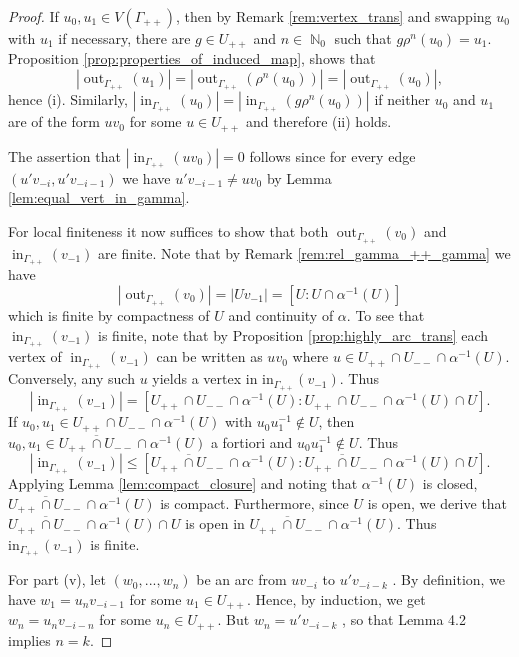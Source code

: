 \documentclass{article}
\DeclareMathOperator\out{out}
\DeclareMathOperator\bbN{\mathbb{N}}
\theoremstyle{definition}
\begin{document}
\begin{proof}
If $u_0,u_1\in V(\Gamma_{++})$, then by Remark \ref{rem:vertex_trans} and swapping $u_0$ with $u_1$ if necessary, there are $g\in U_{++}$ and $n\in\bbN_{0}$ such that $g\rho^{n}(u_0) = u_1$. Proposition \ref{prop:properties_of_induced_map}, shows that \[|\out_{\Gamma_{++}}(u_1)|=|\out_{\Gamma_{++}}(\rho^{n}(u_0))| = |\out_{\Gamma_{++}}(u_0)|,\] hence (i). Similarly, $|\operatorname{in}_{\Gamma_{++}}(u_0)|=|\operatorname{in}_{\Gamma_{++}}(g\rho^{n}(u_0))|$ if neither $u_0$ and $u_1$ are of the form $uv_0$ for some $u\in U_{++}$ and therefore (ii) holds.

The assertion that $|\operatorname{in}_{\Gamma_{++}}(uv_0)| = 0$ follows since for every edge $(u'v_{-i},u'v_{-i-1})$ we have $u'v_{-i-1}\ne uv_0$ by Lemma \ref{lem:equal_vert_in_gamma}.

For local finiteness it now suffices to show that both $\out_{\Gamma_{++}}(v_0)$ and $\operatorname{in}_{\Gamma_{++}}(v_{-1})$ are finite. Note that by Remark \ref{rem:rel_gamma_++_gamma} we have
\[|\out_{\Gamma_{++}}(v_0)|=|Uv_{-1}| = [U:U\cap \alpha^{-1}(U)]\]
which is finite by compactness of $U$ and continuity of $\alpha$. To see that $\operatorname{in}_{\Gamma_{++}}(v_{-1})$ is finite, note that by Proposition \ref{prop:highly_arc_trans} each vertex of $\operatorname{in}_{\Gamma_{++}}(v_{-1})$ can be written as $uv_{0}$ where $u\in U_{++}\cap U_{--}\cap \alpha^{-1}(U)$. Conversely, any such $u$ yields a vertex in $\mathrm{in}_{\Gamma_{++}}(v_{-1})$. Thus
\[|\operatorname{in}_{\Gamma_{++}}(v_{-1})| = [U_{++}\cap U_{--}\cap \alpha^{-1}(U):U_{++}\cap U_{--}\cap \alpha^{-1}(U)\cap U].\]
If $u_{0},u_1\in U_{++}\cap U_{--}\cap \alpha^{-1}(U)$ with $u_0u_1^{-1}\not\in U$, then  $u_{0},u_{1}\!\in\!\overline{U_{++}\cap U_{--}}\cap \alpha^{-1}(U)$ a fortiori and $u_0u_1^{-1}\not\in U$. Thus
\begin{displaymath}
|\operatorname{in}_{\Gamma_{++}}(v_{-1})|\le [\overline{U_{++}\cap U_{--}}\cap \alpha^{-1}(U): \overline{U_{++}\cap U_{--}}\cap \alpha^{-1}(U)\cap U].
\end{displaymath}
Applying Lemma \ref{lem:compact_closure} and noting that $\alpha^{-1}(U)$ is closed, $\overline{U_{++}\cap U_{--}}\cap \alpha^{-1}(U)$ is compact. Furthermore, since $U$ is open, we derive that $\overline{U_{++}\cap U_{--}}\cap \alpha^{-1}(U)\cap U$ is open in $\overline{U_{++}\cap U_{--}}\cap \alpha^{-1}(U)$. Thus $\mathrm{in}_{\Gamma_{++}}(v_{-1})$ is finite.

For part (v), let $(w_{0}, ..., w_{n})$ be an arc from $uv_{−i}$ to $u'v_{−i−k}$ . By definition, we have $w_{1} = u_{n}v_{-i-1}$ for some $u_{1}\in U_{++}$. Hence, by induction, we get $w_{n} = u_{n}v_{-i-n}$ for some $u_{n}\in U_{++}$. But $w_{n}=u'v_{-i-k}$ , so that Lemma 4.2 implies $n = k$.
\end{proof}
\end{document}
